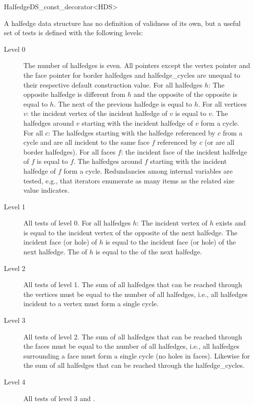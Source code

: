 \begin{ccRefClass}{HalfedgeDS_const_decorator<HDS>}

A halfedge data structure has no definition of validness of its own,
but a useful set of tests is defined with the following levels:
%
\begin{description}
\item[Level 0] 
  The number of halfedges is even. All pointers except
  the vertex pointer and the face pointer for border halfedges and halfedge\_cycles
  are unequal to their respective default construction value.  For all
  halfedges $h$: The opposite halfedge is different from $h$ and the
  opposite of the opposite is equal to $h$. The next of the previous
  halfedge is equal to $h$. For all vertices $v$: the incident vertex
  of the incident halfedge of $v$ is equal to $v$. The halfedges
  around $v$ starting with the incident halfedge of $v$ form a cycle.
  For all  $c$: The halfedges starting with the halfedge 
  referenced by $c$ from a cycle and are all incident to the same face 
  $f$ referenced by $c$ (or are all border halfedges).
  For all faces $f$: the incident face of the incident halfedge of $f$
  is equal to $f$. The halfedges around $f$ starting with the incident
  halfedge of $f$ form a cycle.
  Redundancies among internal variables
  are tested, e.g., that iterators enumerate as many items as the
  related size value indicates.
\item[Level 1] 
  All tests of level 0. For all halfedges $h$: The
  incident vertex of $h$ exists and is equal to the incident vertex of
  the opposite of the next halfedge. The incident face (or hole) of
  $h$ is equal to the incident face (or hole) of the next halfedge.
  The  of $h$ is equal to the 
   of the next halfedge.
\item[Level 2]
  All tests of level 1. The sum of all halfedges that can
  be reached through the vertices must be equal to the number of all
  halfedges, i.e., all halfedges incident to a vertex must form a single
  cycle.
\item[Level 3]
  All tests of level 2. The sum of all halfedges that can
  be reached through the faces must be equal to the number of all
  halfedges, i.e., all halfedges surrounding a face must form a single
  cycle (no holes in faces). Likewise for the sum of all halfedges that
  can be reached through the halfedge\_cycles.
\item[Level 4]
  All tests of level 3 and .
\end{description}


\end{ccRefClass}
